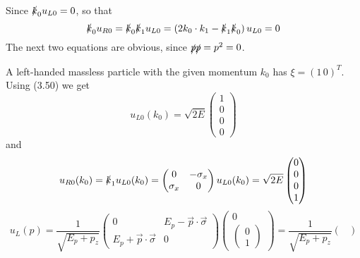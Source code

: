 \solution
\begin{problembody}
    \item Since $\slashed{k}_0 u_{L0} = 0$, so that
    \begin{equation*}
        \slashed{k}_0 u_{R0} = \slashed{k}_0 \slashed{k}_1 u_{L0} = \left(2k_0 \cdot k_1 - \slashed{k}_1 \slashed{k}_0\right) u_{L0} = 0
    \end{equation*}
    The next two equations are obvious, since $\slashed{p}\slashed{p} = p^2 = 0$.

    \item A left-handed massless particle with the given momentum $k_0$ has $\xi = (1 \, 0)^T$. Using (3.50) we get
    \begin{equation*}
        u_{L0}(k_0) = \sqrt{2E} \begin{pmatrix}
            1\\ 0\\ 0\\ 0
        \end{pmatrix}
    \end{equation*}
    and
    \begin{equation*}
        u_{R0}(k_0) = \slashed{k}_1 u_{L0}(k_0) = \begin{pmatrix}
            0 & -\sigma_x \\
            \sigma_x & 0
        \end{pmatrix} u_{L0}(k_0) = \sqrt{2E}\begin{pmatrix}
            0 \\ 0 \\ 0 \\ 1
        \end{pmatrix}
    \end{equation*}
    \begin{equation*}
        u_L(p) = \frac{1}{\sqrt{E_p + p_z}} \begin{pmatrix}
            0 & E_p - \vec{p}\cdot\vec{\sigma} \\
            E_p + \vec{p}\cdot\vec{\sigma} & 0
        \end{pmatrix} \begin{pmatrix}
            0 \\
            \begin{pmatrix}
                0 \\ 1
            \end{pmatrix}
        \end{pmatrix} = \frac{1}{\sqrt{E_p + p_z}} \begin{pmatrix}

\end{pmatrix}
\end{equation*}
\end{problembody}
